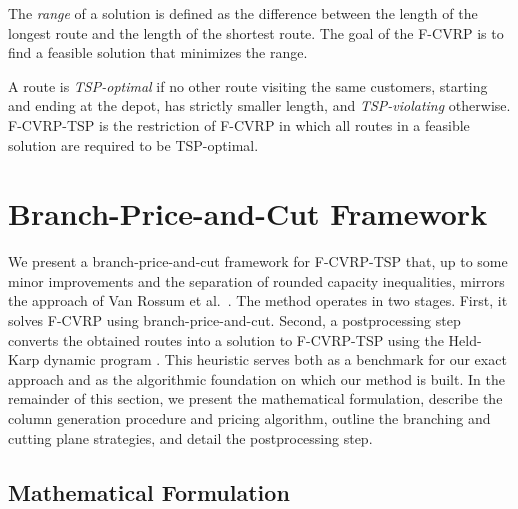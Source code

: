 \documentclass[a4paper,fleqn]{cas-dc}%
\newcommand{\CitetVR}[1]{Van Rossum et al.\ \cite{#1}}
\begin{document}
The \emph{range} of a solution is defined as the difference between the length of the longest route and the length of the shortest route. The goal of the F-CVRP is to find a feasible solution that minimizes the range.

A route is \emph{TSP-optimal} if no other route visiting the same customers, starting and ending at the depot, has strictly smaller length, and \emph{TSP-violating} otherwise. F-CVRP-TSP is the restriction of F-CVRP in which all routes in a feasible solution are required to be TSP-optimal.

\section{Branch-Price-and-Cut Framework}
\label{sec:branchPrice}

We present a branch-price-and-cut framework for F-CVRP-TSP that, up to some minor improvements and the separation of rounded capacity inequalities, mirrors the approach of \CitetVR{rossum2025efficient}. The method operates in two stages. First, it solves F-CVRP using branch-price-and-cut. Second, a postprocessing step converts the obtained routes into a solution to F-CVRP-TSP using the Held-Karp dynamic program \citep{held1962dynamic}. This heuristic serves both as a benchmark for our exact approach and as the algorithmic foundation on which our method is built. In the remainder of this section, we present the mathematical formulation, describe the column generation procedure and pricing algorithm, outline the branching and cutting plane strategies, and detail the postprocessing step.

\subsection{Mathematical Formulation}
\label{subsec:formulation}
\end{document}
